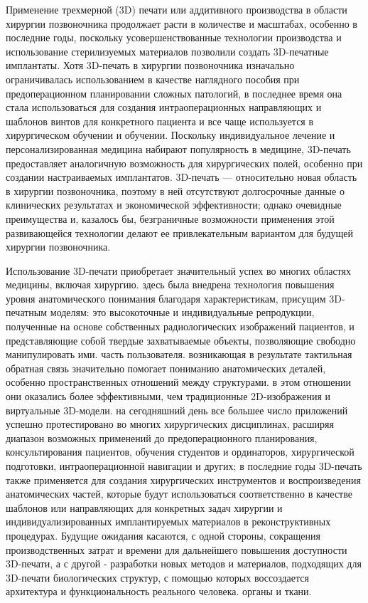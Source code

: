 Применение трехмерной (3D) печати или аддитивного производства в области
хирургии позвоночника продолжает расти в количестве и масштабах, особенно в
последние годы, поскольку усовершенствованные технологии производства и
использование стерилизуемых материалов позволили создать 3D-печатные имплантаты.
Хотя 3D-печать в хирургии позвоночника изначально ограничивалась использованием
в качестве наглядного пособия при предоперационном планировании сложных
патологий, в последнее время она стала использоваться для создания
интраоперационных направляющих и шаблонов винтов для конкретного пациента и все
чаще используется в хирургическом обучении и обучении. Поскольку индивидуальное
лечение и персонализированная медицина набирают популярность в медицине,
3D-печать предоставляет аналогичную возможность для хирургических полей,
особенно при создании настраиваемых имплантатов. 3D-печать — относительно новая
область в хирургии позвоночника, поэтому в ней отсутствуют долгосрочные данные о
клинических результатах и экономической эффективности; однако
очевидные преимущества и, казалось бы, безграничные возможности применения этой
развивающейся технологии делают ее привлекательным вариантом для будущей
хирургии позвоночника.\cite{31624730}

Использование 3D-печати приобретает значительный успех во многих областях
медицины, включая хирургию. здесь была внедрена технология повышения уровня
анатомического понимания благодаря характеристикам, присущим 3D-печатным
моделям: это высокоточные и индивидуальные репродукции, полученные на основе
собственных радиологических изображений пациентов, и представляющие собой
твердые захватываемые объекты, позволяющие свободно манипулировать ими. часть
пользователя. возникающая в результате тактильная обратная связь значительно
помогает пониманию анатомических деталей, особенно пространственных отношений
между структурами. в этом отношении они оказались более эффективными, чем
традиционные 2D-изображения и виртуальные 3D-модели. на сегодняшний день все
большее число приложений успешно протестировано во многих хирургических
дисциплинах, расширяя диапазон возможных применений до предоперационного
планирования, консультирования пациентов, обучения студентов и ординаторов,
хирургической подготовки, интраоперационной навигации и других; в последние годы
3D-печать также применяется для создания хирургических инструментов и
воспроизведения анатомических частей, которые будут использоваться
соответственно в качестве шаблонов или направляющих для конкретных задач
хирургии и индивидуализированных имплантируемых материалов в реконструктивных
процедурах. Будущие ожидания касаются, с одной стороны, сокращения
производственных затрат и времени для дальнейшего повышения доступности
3D-печати, а с другой - разработки новых методов и материалов, подходящих для
3D-печати биологических структур, с помощью которых воссоздается архитектура и
функциональность реального человека. органы и ткани.\cite{30167991}

